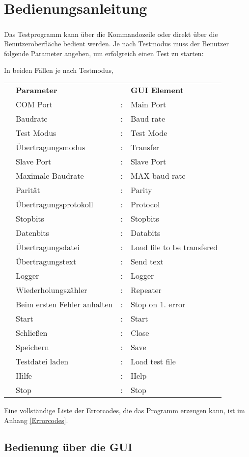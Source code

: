 \chapter{Bedienungsanleitung}\label{chp:bedienungsanleitung}
\paragraph{}
Das Testprogramm kann über die Kommandozeile oder direkt über die Benutzeroberfläche bedient werden. Je nach Testmodus muss der Benutzer folgende Parameter angeben, um erfolgreich einen Test zu starten:


In beiden Fällen  je nach Testmodus, 
\\
\begin{tabular}{llll}
\\ &\textbf{Parameter} & &\textbf{GUI Element}
\\ &COM Port &: &Main Port
\\ &Baudrate &: &Baud rate
\\ &Test Modus &: &Test Mode
\\ &Übertragungsmodus &: &Transfer
\\ &Slave Port &: &Slave Port
\\ &Maximale Baudrate &: &MAX baud rate
\\ &Parität &: &Parity
\\ &Übertragungsprotokoll &: &Protocol
\\ &Stopbits &: &Stopbits
\\ &Datenbits &: &Databits
\\ &Übertragungsdatei &: &Load file to be transfered
\\ &Übertragungstext &: &Send text
\\ &Logger &: &Logger
\\ &Wiederholungszähler &: &Repeater
\\ &Beim ersten Fehler anhalten &: &Stop on 1. error
\\ &Start &: &Start
\\ &Schließen &: &Close
\\ &Speichern &: &Save
\\ &Testdatei laden &: &Load test file
\\ &Hilfe &: &Help
\\ &Stop &: &Stop
\end{tabular}

Eine vollständige Liste der Errorcodes, die das Programm erzeugen kann,  ist im Anhang \ref{Errorcodes}.

\section{Bedienung über die GUI}
